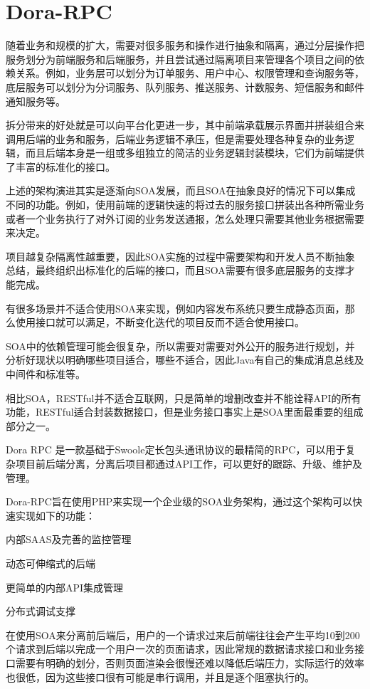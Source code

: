 \chapter{Dora-RPC}

随着业务和规模的扩大，需要对很多服务和操作进行抽象和隔离，通过分层操作把服务划分为前端服务和后端服务，并且尝试通过隔离项目来管理各个项目之间的依赖关系。例如，业务层可以划分为订单服务、用户中心、权限管理和查询服务等，底层服务可以划分为分词服务、队列服务、推送服务、计数服务、短信服务和邮件通知服务等。

拆分带来的好处就是可以向平台化更进一步，其中前端承载展示界面并拼装组合来调用后端的业务和服务，后端业务逻辑不承压，但是需要处理各种复杂的业务逻辑，而且后端本身是一组或多组独立的简洁的业务逻辑封装模块，它们为前端提供了丰富的标准化的接口。

上述的架构演进其实是逐渐向SOA发展，而且SOA在抽象良好的情况下可以集成不同的功能。例如，使用前端的逻辑快速的将过去的服务接口拼装出各种所需业务或者一个业务执行了对外订阅的业务发送通报，怎么处理只需要其他业务根据需要来决定。

项目越复杂隔离性越重要，因此SOA实施的过程中需要架构和开发人员不断抽象总结，最终组织出标准化的后端的接口，而且SOA需要有很多底层服务的支撑才能完成。

有很多场景并不适合使用SOA来实现，例如内容发布系统只要生成静态页面，那么使用接口就可以满足，不断变化迭代的项目反而不适合使用接口。

SOA中的依赖管理可能会很复杂，所以需要对需要对外公开的服务进行规划，并分析好现状以明确哪些项目适合，哪些不适合，因此Java有自己的集成消息总线及中间件和标准等。

相比SOA，RESTful并不适合互联网，只是简单的增删改查并不能诠释API的所有功能，RESTful适合封装数据接口，但是业务接口事实上是SOA里面最重要的组成部分之一。


Dora RPC 是一款基础于Swoole定长包头通讯协议的最精简的RPC，可以用于复杂项目前后端分离，分离后项目都通过API工作，可以更好的跟踪、升级、维护及管理。

Dora-RPC旨在使用PHP来实现一个企业级的SOA业务架构，通过这个架构可以快速实现如下的功能：

\begin{compactitem}
\item 内部SAAS及完善的监控管理
\item 动态可伸缩式的后端
\item 更简单的内部API集成管理
\item 分布式调试支撑
\end{compactitem}

在使用SOA来分离前后端后，用户的一个请求过来后前端往往会产生平均10到200个请求到后端以完成一个用户​一次的页面请求，因此常规的数据请求接口和业务接口需要有明确的划分，否则页面渲染会很慢还难以降低后端压力，实际运行的效率也很低，因为这些接口很有可能是串行调用，并且是逐个阻塞执行的。

